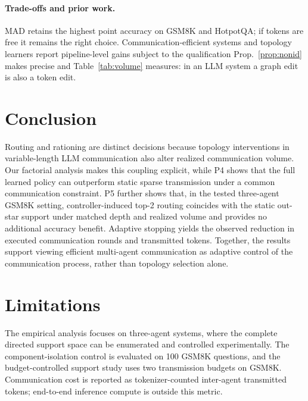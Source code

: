 \documentclass[11pt]{article}
\begin{document}
\paragraph{Trade-offs and prior work.} MAD retains the highest point accuracy on
GSM8K and HotpotQA; if tokens are free it remains the right choice.
Communication-efficient systems \citep{zhang2025cut,wang-etal-2025-agentdropout}
and topology learners \citep{zhang2025gdesigner,zhuge2024gptswarm,li2026assemble}
report pipeline-level gains subject to the qualification
Prop.~\ref{prop:nonid} makes precise and Table~\ref{tab:volume} measures: in an
LLM system a graph edit is also a token edit.

\section{Conclusion}
\label{sec:conclusion}

Routing and rationing are distinct decisions because topology interventions in
variable-length LLM communication also alter realized communication volume.
Our factorial analysis makes this coupling explicit, while P4 shows that the
full learned policy can outperform static sparse transmission under a common
communication constraint. P5 further shows that, in the tested three-agent
GSM8K setting, controller-induced top-2 routing coincides with the static
out-star support under matched depth and realized volume and provides no
additional accuracy benefit. Adaptive stopping yields the observed reduction in
executed communication rounds and transmitted tokens. Together, the results
support viewing efficient multi-agent communication as adaptive control of the
communication process, rather than topology selection alone.


\section{Limitations}
\label{sec:limitations}

The empirical analysis focuses on three-agent systems, where the complete
directed support space can be enumerated and controlled experimentally. The
component-isolation control is evaluated on 100 GSM8K questions, and the
budget-controlled support study uses two transmission budgets on GSM8K.
Communication cost is reported as tokenizer-counted inter-agent transmitted
tokens; end-to-end inference compute is outside this metric.
\end{document}
